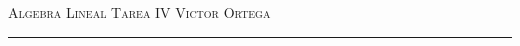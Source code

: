 \documentclass[12pt]{article}
\begin{document}
\thispagestyle{empty}

{\scshape Algebra Lineal} \hfill {\scshape \large Tarea IV} \hfill {\scshape Victor Ortega}
 
\smallskip

\hrule

\bigskip

\bigskip

\theoremstyle{definition}
\newtheorem*{definition}{Definición}

\theoremstyle{definition}
\newtheorem*{remark}{Observación}

\theoremstyle{definition}
\newtheorem*{dem}{Demostración}

\theoremstyle{definition}
\newtheorem*{notation}{Notación}

\theoremstyle{definition}
\newtheorem*{theorem}{Teorema}

\theoremstyle{definition}
\newtheorem*{lema}{Lema}

\theoremstyle{remark}
\newtheorem*{observation}{Observación}

\theoremstyle{remark}
\newtheorem*{example}{Ejemplo}
\end{document}
